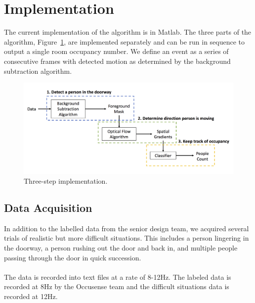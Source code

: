 \documentclass[12pt,oneside]{article} %
\begin{document}
\section{Implementation}  %
The current implementation of the algorithm is in Matlab. The three parts of the algorithm, Figure~\ref{threestep},
are implemented
separately and can be run in sequence to output a single room occupancy number. We define an event as a series of consecutive frames with detected motion as determined by the background subtraction algorithm.
\begin{figure}[htb] %
\centering
\includegraphics[scale=0.2]{images/threestep.png}
\caption{Three-step implementation.}
\label{threestep}
\end{figure}

\subsection{Data Acquisition}  %
In addition to the labelled data from the senior design team, we acquired several trials of realistic but more
difficult situations. This includes a person lingering in the doorway, a person rushing out the door and back in, and multiple people passing through
the door in quick succession.
\\ \\
The data is recorded into text files at a rate of 8-12Hz. The labeled data is recorded at 8Hz
by the Occusense team and the difficult situations data is recorded at 12Hz.
\end{document}
